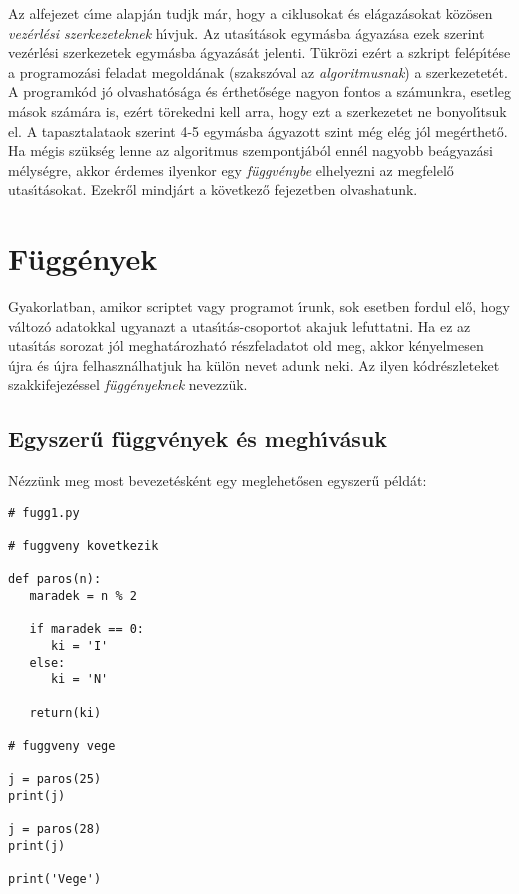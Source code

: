 \documentclass[12pt]{article}
\newcounter{feladat}
\newcounter{megold}
\begin{document}
Az alfejezet c\'{\i}me alapj\'an tudjk m\'ar,  hogy a ciklusokat \'es el\'agaz\'asokat k\"oz\"osen {\sl vez\'erl\'esi 
szerkezeteknek}  h\'{\i}vjuk. Az utas\'{\i}t\'asok egym\'asba \'agyaz\'asa ezek szerint 
vez\'erl\'esi szerkezetek
egym\'asba \'agyaz\'as\'at jelenti. T\"ukr\"ozi ez\'ert a szkript fel\'ep\'{\i}t\'ese a programoz\'asi feladat 
megold\'anak (szaksz\'oval az {\sl algoritmusnak})  a szerkezetet\'et. A programk\'od j\'o 
olvashat\'os\'aga \'es 
\'erthet\H{o}s\'ege nagyon fontos a sz\'amunkra, esetleg m\'asok sz\'am\'ara is, ez\'ert t\"orekedni kell arra, hogy 
ezt a szerkezetet ne bonyol\'{\i}tsuk el. A tapasztalataok szerint 4-5  egym\'asba \'agyazott szint m\'eg el\'eg 
j\'ol meg\'erthet\H{o}. Ha m\'egis sz\"uks\'eg lenne az algoritmus szempontj\'ab\'ol enn\'el nagyobb be\'agyaz\'asi 
m\'elys\'egre, akkor \'erdemes ilyenkor egy {\sl f\"uggv\'enybe}  elhelyezni az megfelel\H{o} 
utas\'{\i}t\'asokat. Ezekr\H{o}l mindj\'art a k\"ovetkez\H{o} fejezetben olvashatunk.

\section{F\"ugg\'enyek}

Gyakorlatban, amikor scriptet vagy programot \'{\i}runk, sok esetben fordul el\H{o}, hogy v\'altoz\'o adatokkal 
ugyanazt a utas\'{\i}t\'as-csoportot akajuk lefuttatni. Ha ez az utas\'{\i}t\'as sorozat j\'ol meghat\'arozhat\'o 
r\'eszfeladatot old meg, akkor k\'enyelmesen \'ujra \'es \'ujra felhaszn\'alhatjuk ha k\"ul\"on nevet adunk neki. 
Az ilyen k\'odr\'eszleteket szakkifejez\'essel {\sl f\"ugg\'enyeknek}  nevezz\"uk. 

\subsection{Egyszer\H{u} f\"uggv\'enyek \'es megh\'{\i}v\'asuk}

N\'ezz\"unk meg most bevezet\'esk\'ent egy meglehet\H{o}sen egyszer\H{u} p\'eld\'at:

\begin{Verbatim}[fontsize=\small]
# fugg1.py

# fuggveny kovetkezik

def paros(n):
   maradek = n % 2

   if maradek == 0:
      ki = 'I'
   else:
      ki = 'N'

   return(ki)

# fuggveny vege

j = paros(25)
print(j)

j = paros(28)
print(j)

print('Vege')  
\end{Verbatim}
\end{document}
